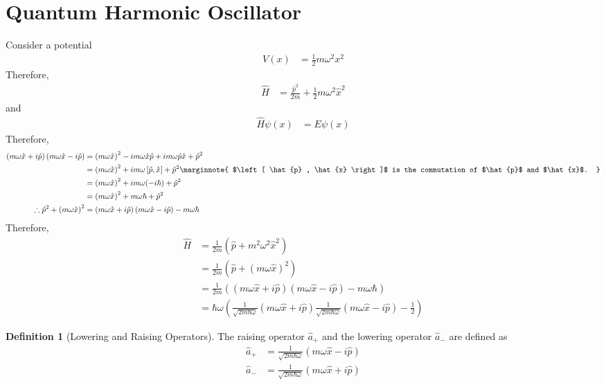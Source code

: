 \documentclass[titlepage, fleqn, a4paper, 12pt, twoside]{article}
\theoremstyle{definition}
\newtheorem{definition}{Definition}
\theoremstyle{theorem}
\begin{document}
\section{Quantum Harmonic Oscillator}

Consider a potential
\begin{align*}
	V(x) &= \frac{1}{2} m \omega^2 x^2
\end{align*}
Therefore,
\begin{align*}
	\hat{H} &= \frac{\hat{p}^2}{2 m} + \frac{1}{2} m \omega^2 \hat{x}^2
\end{align*}
and
\begin{align*}
	\hat{H} \psi(x) &= E \psi(x)
\end{align*}
Therefore,
\begin{align*}
	\left( m \omega \hat{x} + i \hat{p} \right) \left( m \omega \hat{x} - i \hat{p} \right) &= \left( m \omega \hat{x} \right)^2 - i m \omega \hat{x} \hat{p} + i m \omega \hat{p} \hat{x} + \hat{p}^2\\
	&= \left( m \omega \hat{x} \right)^2 + i m \omega \left[ \hat{p} , \hat{x} \right] + \hat{p}^2
	\marginnote
	{
		$\left[ \hat{p} , \hat{x} \right]$ is the commutation of $\hat{p}$ and $\hat{x}$.
	}\\
	&= \left( m \omega \hat{x} \right)^2 + i m \omega (- i \hbar) + \hat{p}^2\\
	&= \left( m \omega \hat{x} \right)^2 + m \omega \hbar + \hat{p}^2\\
	\therefore \hat{p}^2 + \left( m \omega \hat{x} \right)^2 &= \left( m \omega \hat{x} + i \hat{p} \right) \left( m \omega \hat{x} - i \hat{p} \right) - m \omega \hbar
\end{align*}
Therefore,
\begin{align*}
	\hat{H} &= \frac{1}{2 m} \left( \hat{p} + m^2 \omega^2 \hat{x}^2 \right)\\
	&= \frac{1}{2 m} \left( \hat{p} + \left( m \omega \hat{x} \right)^2 \right)\\
	&= \frac{1}{2 m} \left( \left( m \omega \hat{x} + i \hat{p} \right) \left( m \omega \hat{x} - i \hat{p} \right) - m \omega \hbar \right)\\
	&= \hbar \omega \left( \frac{1}{\sqrt{2 m \hbar \omega}} \left( m \omega \hat{x} + i \hat{p} \right) \frac{1}{\sqrt{2 m \hbar \omega}} \left( m \omega \hat{x} - i \hat{p} \right) - \frac{1}{2} \right)
\end{align*}

\begin{definition}[Lowering and Raising Operators]
	The raising operator $\hat{a}_+$ and the lowering operator $\hat{a}_-$ are defined as
	\begin{align*}
		\hat{a}_+ &= \frac{1}{\sqrt{2 m \hbar \omega}} \left( m \omega \hat{x} - i \hat{p} \right)\\
		\hat{a}_- &= \frac{1}{\sqrt{2 m \hbar \omega}} \left( m \omega \hat{x} + i \hat{p} \right)
	\end{align*}
\end{definition}
\end{document}
